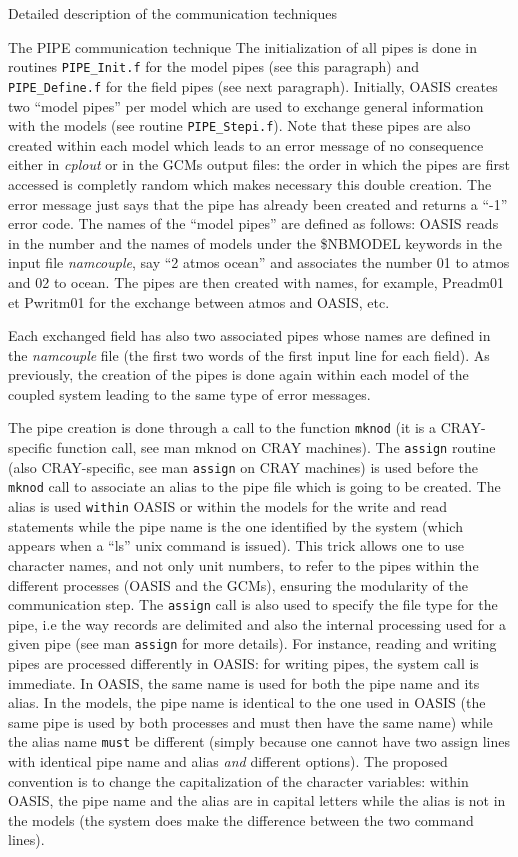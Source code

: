 \begin{section}{Detailed description of the communication techniques}
\begin{subsection}{The PIPE communication technique}
The initialization of all pipes is done in routines {\tt PIPE\_Init.f} for the
model pipes (see this paragraph) and
{\tt PIPE\_Define.f} for the field pipes (see next paragraph).
Initially, OASIS creates two ``model pipes'' per model which are used to
exchange general information with the models (see routine 
{\tt PIPE\_Stepi.f}). 
Note that these pipes are also created
within each model which leads to an error 
message of no consequence either in {\it cplout} or in the GCMs output files: 
the order in which the pipes are first accessed is completly
random which makes necessary this double creation. The error message just says
that the pipe has already been created and 
returns a ``-1'' error code. The names of the ``model pipes'' are defined as
follows: OASIS reads in the number and the names of models under 
the \$NBMODEL keywords in the input file {\em namcouple}, say 
``2 atmos ocean'' and associates the number 01 to atmos and 02 to ocean. 
The pipes are then created with names, for example, Preadm01 et Pwritm01 
for the exchange between atmos and OASIS, etc. 

Each exchanged field has also two associated pipes whose names are defined in
the {\it namcouple} file (the first two words of the first input line 
for each field). As previously, the creation of the pipes is done again 
within each model of the coupled system 
leading to the same type of error messages.

The pipe creation is done through a call to the function {\tt mknod}
(it is a CRAY-specific function call, see man mknod on CRAY machines).
The {\tt assign} routine (also CRAY-specific, see man {\tt assign} on CRAY machines)
 is used before the {\tt mknod}
call to associate an alias to the pipe file which is going to be created.
The alias is used {\tt within} OASIS or within the models for the write and 
read statements
while the pipe name is the one identified by the system (which appears when 
a ``ls'' unix command is issued). This trick allows one to use character names,
and not only unit numbers, to refer to the pipes within the different 
processes (OASIS and the GCMs),
ensuring the modularity of the communication step. The {\tt assign} call
is also used to specify the file type for the pipe, i.e the way records
are delimited and also the internal processing used for a given pipe
(see man {\tt assign} for more details). For instance, reading and writing pipes
are processed differently in OASIS: for writing pipes, the system call is
immediate.
In OASIS, the same name is used for
both the pipe name and its alias. In the models, the pipe name is identical
to the one used in OASIS (the same pipe is used by both processes and must
then have the same name) while the alias name {\tt must} be different
(simply because one cannot have two assign lines with identical pipe name and
alias {\it and} different options). The
proposed convention is to change the capitalization of the character variables:
within OASIS, the pipe name and the alias are in capital letters while the
alias is not in the models (the system does make the difference between the 
two command lines).


\end{subsection}
\end{section}
